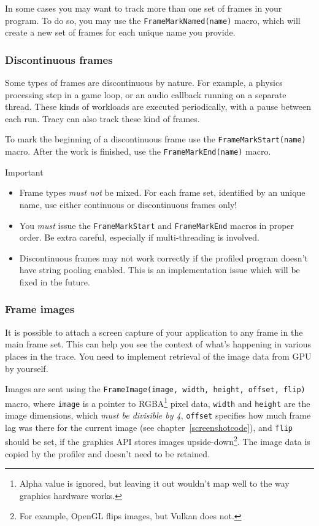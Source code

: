 \documentclass[hidelinks,titlepage,a4paper]{article}
\begin{document}
In some cases you may want to track more than one set of frames in your program. To do so, you may use the \texttt{FrameMarkNamed(name)} macro, which will create a new set of frames for each unique name you provide.

\subsubsection{Discontinuous frames}

Some types of frames are discontinuous by nature. For example, a physics processing step in a game loop, or an audio callback running on a separate thread. These kinds of workloads are executed periodically, with a pause between each run. Tracy can also track these kind of frames.

To mark the beginning of a discontinuous frame use the \texttt{FrameMarkStart(name)} macro. After the work is finished, use the \texttt{FrameMarkEnd(name)} macro.

\begin{bclogo}[
noborder=true,
couleur=black!5,
logo=\bcbombe
]{Important}
\begin{itemize}
\item Frame types \emph{must not} be mixed. For each frame set, identified by an unique name, use either continuous or discontinuous frames only!
\item You \emph{must} issue the \texttt{FrameMarkStart} and \texttt{FrameMarkEnd} macros in proper order. Be extra careful, especially if multi-threading is involved.
\item Discontinuous frames may not work correctly if the profiled program doesn't have string pooling enabled. This is an implementation issue which will be fixed in the future.
\end{itemize}
\end{bclogo}

\subsubsection{Frame images}
\label{frameimages}

It is possible to attach a screen capture of your application to any frame in the main frame set. This can help you see the context of what's happening in various places in the trace. You need to implement retrieval of the image data from GPU by yourself.

Images are sent using the \texttt{FrameImage(image, width, height, offset, flip)} macro, where \texttt{image} is a pointer to RGBA\footnote{Alpha value is ignored, but leaving it out wouldn't map well to the way graphics hardware works.} pixel data, \texttt{width} and \texttt{height} are the image dimensions, which \emph{must be divisible by 4}, \texttt{offset} specifies how much frame lag was there for the current image (see chapter~\ref{screenshotcode}), and \texttt{flip} should be set, if the graphics API stores images upside-down\footnote{For example, OpenGL flips images, but Vulkan does not.}. The image data is copied by the profiler and doesn't need to be retained.
\end{document}
